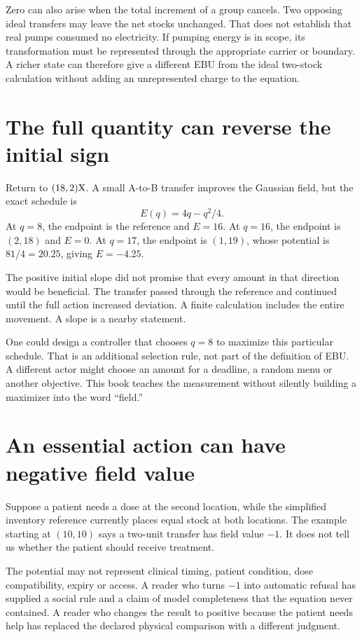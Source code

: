 Zero can also arise when the total increment of a group cancels. Two opposing ideal transfers may leave the net stocks unchanged. That does not establish that real pumps consumed no electricity. If pumping energy is in scope, its transformation must be represented through the appropriate carrier or boundary. A richer state can therefore give a different EBU from the ideal two-stock calculation without adding an unrepresented charge to the equation.

\section{The full quantity can reverse the initial sign}
Return to $(18,2)\mathrm{X}$. A small A-to-B transfer improves the Gaussian field, but the exact schedule is
\[
 E(q)=4q-q^2/4.
\]
At $q=8$, the endpoint is the reference and $E=16$. At $q=16$, the endpoint is $(2,18)$ and $E=0$. At $q=17$, the endpoint is $(1,19)$, whose potential is $81/4=20.25$, giving $E=-4.25$.

The positive initial slope did not promise that every amount in that direction would be beneficial. The transfer passed through the reference and continued until the full action increased deviation. A finite calculation includes the entire movement. A slope is a nearby statement.

One could design a controller that chooses $q=8$ to maximize this particular schedule. That is an additional selection rule, not part of the definition of EBU. A different actor might choose an amount for a deadline, a random menu or another objective. This book teaches the measurement without silently building a maximizer into the word ``field.''

\section{An essential action can have negative field value}
Suppose a patient needs a dose at the second location, while the simplified inventory reference currently places equal stock at both locations. The example starting at $(10,10)$ says a two-unit transfer has field value $-1$. It does not tell us whether the patient should receive treatment.

The potential may not represent clinical timing, patient condition, dose compatibility, expiry or access. A reader who turns $-1$ into automatic refusal has supplied a social rule and a claim of model completeness that the equation never contained. A reader who changes the result to positive because the patient needs help has replaced the declared physical comparison with a different judgment.

